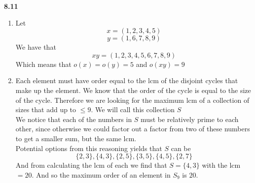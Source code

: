 \documentclass[12pt]{article}
\newenvironment{ques}{\vspace{2 ex}}{\vspace{2 ex}}
\theoremstyle{definition}
\begin{document}
\begin{ques}
	\textbf{8.11}
		\begin{enumerate} 
			\item Let 
				$$x = (1, 2, 3, 4, 5)$$
				$$y = (1, 6, 7, 8, 9)$$
				We have that
				$$xy = (1, 2, 3, 4, 5, 6, 7, 8, 9)$$
				Which means that $o(x) = o(y) = 5$ and $o(xy) = 9$
			\item Each element must have order equal to the
				lcm of the disjoint cycles that make up the
				element. We know that the order of the cycle is
				equal to the size of the cycle. Therefore we
				are looking for the maximum lcm of a collection
				of sizes that add up to $\leq 9$. We will call
				this collection $S$\\
				We notice that each of the numbers in $S$ must
				be relatively prime to each other, since
				otherwise we could factor out a factor from two
				of these numbers to get a smaller sum, but the
				same lcm.\\
				Potential options from this reasoning yields that $S$ can be
				$$\{2,3\}, \{4,3\}, \{2,5\},\{3,5\}, \{4,5\}, \{2, 7\}$$
				And from calculating the lcm of each we find
				that $S = \{4,3\}$ with the lcm $= 20$. And so
				the maximum order of an element in $S_9$ is
				$20$.

		\end{enumerate}
\end{ques}
\end{document}
